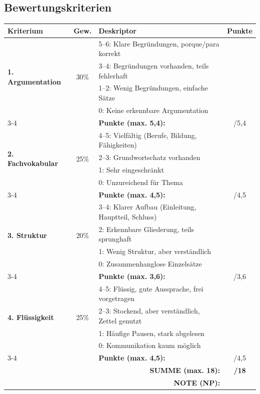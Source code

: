 \documentclass[11pt,a4paper]{article}
\begin{document}
\vspace{1em}

\subsection*{Bewertungskriterien}

\begin{tabular}{|p{4cm}|c|p{6cm}|c|}
\hline
\textbf{Kriterium} & \textbf{Gew.} & \textbf{Deskriptor} & \textbf{Punkte} \\
\hline
\hline
\multirow{4}{*}{\textbf{1. Argumentation}} & \multirow{4}{*}{30\%} & 5--6: Klare Begründungen, porque/para korrekt & \\
\textbf{(+ Konjunktionen)} & & 3--4: Begründungen vorhanden, teils fehlerhaft & \\
& & 1--2: Wenig Begründungen, einfache Sätze & \\
& & 0: Keine erkennbare Argumentation & \\
\cline{3-4}
& & \textbf{Punkte (max. 5,4):} & /5,4 \\
\hline
\hline
\multirow{4}{*}{\textbf{2. Fachvokabular}} & \multirow{4}{*}{25\%} & 4--5: Vielfältig (Berufe, Bildung, Fähigkeiten) & \\
\textbf{(Berufe/Bildung)} & & 2--3: Grundwortschatz vorhanden & \\
& & 1: Sehr eingeschränkt & \\
& & 0: Unzureichend für Thema & \\
\cline{3-4}
& & \textbf{Punkte (max. 4,5):} & /4,5 \\
\hline
\hline
\multirow{4}{*}{\textbf{3. Struktur}} & \multirow{4}{*}{20\%} & 3--4: Klarer Aufbau (Einleitung, Hauptteil, Schluss) & \\
\textbf{(+ Kohärenz)} & & 2: Erkennbare Gliederung, teils sprunghaft & \\
& & 1: Wenig Struktur, aber verständlich & \\
& & 0: Zusammenhanglose Einzelsätze & \\
\cline{3-4}
& & \textbf{Punkte (max. 3,6):} & /3,6 \\
\hline
\hline
\multirow{4}{*}{\textbf{4. Flüssigkeit}} & \multirow{4}{*}{25\%} & 4--5: Flüssig, gute Aussprache, frei vorgetragen & \\
\textbf{(+ Aussprache)} & & 2--3: Stockend, aber verständlich, Zettel genutzt & \\
& & 1: Häufige Pausen, stark abgelesen & \\
& & 0: Kommunikation kaum möglich & \\
\cline{3-4}
& & \textbf{Punkte (max. 4,5):} & /4,5 \\
\hline
\hline
\multicolumn{3}{|r|}{\textbf{SUMME (max. 18):}} & \textbf{/18} \\
\hline
\multicolumn{3}{|r|}{\textbf{NOTE (NP):}} & \\
\hline
\end{tabular}
\end{document}

